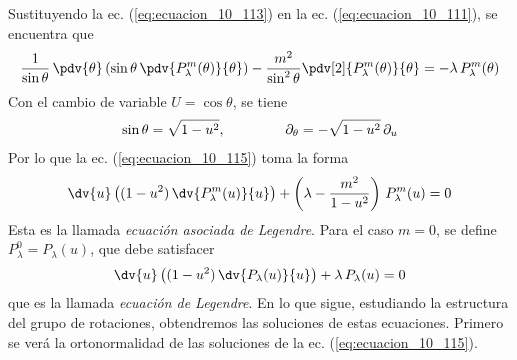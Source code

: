 Sustituyendo la ec. (\ref{eq:ecuacion_10_113}) en la ec. (\ref{eq:ecuacion_10_111}), se encuentra que
\begin{align}
\dfrac{1}{\sin \theta} \, \pdv{\theta} \left( \sin \theta \, \pdv{P_{\lambda}^{m} (\theta)}{\theta} \right) - \dfrac{m^{2}}{\sin^{2} \theta} \pdv[2]{P_{\lambda}^{m} (\theta)}{\theta} = - \lambda \, P_{\lambda}^{m} (\theta) \label{eq:ecuacion_10_115}
\end{align}
Con el cambio de variable $U = \cos \theta$, se tiene
\begin{align}
\sin \theta = \sqrt{1 - u^{2}}, \hspace{1.5cm} \partial_{\theta} = - \sqrt{1 - u^{2}} \, \partial_{u}
\label{eq:ecuacion_10_116}
\end{align}
Por lo que la ec. (\ref{eq:ecuacion_10_115}) toma la forma
\begin{align}
\dv{u} \left( (1 - u^{2}) \, \dv{P_{\lambda}^{m} (u)}{u} \right) + \left( \lambda - \dfrac{m^{2}}{1 - u^{2}} \right) \, P_{\lambda}^{m} (u) = 0
\label{eq:ecuacion_10_117}
\end{align}
Esta es la llamada \emph{ecuación asociada de Legendre}.
 Para el caso $m = 0$, se define $P_{\lambda}^{0} = P_{\lambda} (u)$, que debe satisfacer
 \begin{align}
\dv{u} \left( (1 - u^{2}) \, \dv{P_{\lambda} (u)}{u} \right) + \lambda \, P_{\lambda} (u) = 0
\label{eq:ecuacion_10_118}
\end{align}
que es la llamada \emph{ecuación de Legendre}. En lo que sigue, estudiando la estructura del grupo de rotaciones, obtendremos las soluciones de estas ecuaciones. Primero se verá la ortonormalidad de las soluciones de la ec. (\ref{eq:ecuacion_10_115}).
